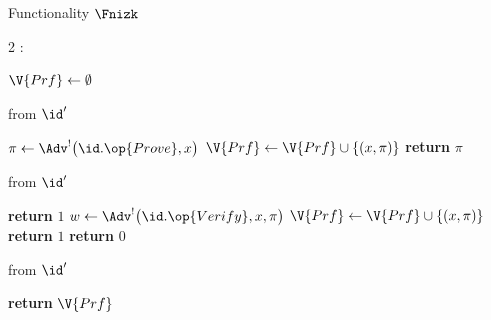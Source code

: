 \begin{interface}[nofloat]{Functionality $\Fnizk$ \\
}

{\scriptsize
\setlength{\columnsep}{1.4em}
\begin{multicols}{2}
:
\begin{algorithmic}[1]
\setcounter{contline}{0}\algcont
\State $\V{Prf} \gets \emptyset$
\algsave
\end{algorithmic}
\vspace{1.4ex}

 \quad from $\id'$
\begin{algorithmic}[1]
\algcont
{} \label{ln:nizkrel}
\State $\pi \gets \Adv^{!}\bigl(\id.\op{Prove}, x\bigr)$ \label{ln:nizkzk}
\State $\V{Prf} \gets \V{Prf} \cup \{(x, \pi)\}$
\State \textbf{return} $\pi$
\algsave
\end{algorithmic}
\vspace{1.4ex}

\columnbreak

 \quad from $\id'$
\begin{algorithmic}[1]
\algcont
{}
\State \textbf{return} $1$ \label{ln:nizktrans}
\EndIf
\State $w \gets \Adv^{!}\bigl(\id.\op{Verify}, x, \pi\bigr)$ \label{ln:nizkext}
\State $\V{Prf} \gets \V{Prf} \cup \{(x, \pi)\}$ \label{ln:nizksound}
\State \textbf{return} $1$
\EndIf
\State \textbf{return} $0$
\algsave
\end{algorithmic}
\vspace{1.4ex}

 \quad from $\id'$
\begin{algorithmic}[1]
\algcont
\State \textbf{return} $\V{Prf}$ \label{ln:nizkleak}
\algsave
\end{algorithmic}
\end{multicols}}
\end{interface}
